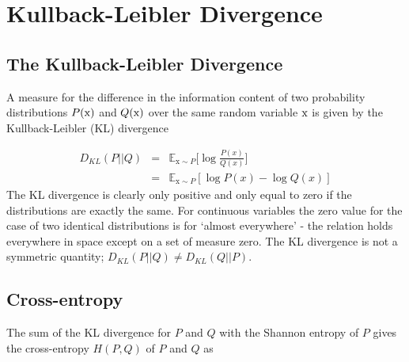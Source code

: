 \documentclass[twocolumn]{article}
\numberwithin{equation}{section}
\begin{document}

\section{Kullback-Leibler Divergence}\label{appendix:kl_div} 

\subsection{The Kullback-Leibler Divergence}\label{appendix:kl_div_section}

A measure for the difference in the information content of two probability distributions $P(\textup{x})$ and 
$Q(\textup{x})$ over the same random variable $\textup{x}$ is given by the Kullback-Leibler (KL) divergence 

\begin{eqnarray}
  D_{KL}(P||Q) &=& \mathbb{E}_{\text{x}\sim P} \bigg [\log \frac{P(x)}{Q(x)} \bigg ]\nonumber \\ 
               &=& \mathbb{E}_{\text{x}\sim P} [\log P(x) - \log Q(x)]  %
\end{eqnarray}
The KL divergence is clearly only positive and only equal to zero if the distributions are exactly the same. For 
continuous variables the zero value for the case of two identical distributions is for `almost everywhere' - the 
relation holds everywhere in space except on a set of measure zero. The KL divergence is not a symmetric quantity; 
$D_{KL}(P||Q) \neq  D_{KL}(Q||P)$.


\subsection{Cross-entropy}\label{appendix:cross_entropy}
The sum of the KL divergence for $P$ and $Q$ with the Shannon entropy of $P$ gives the cross-entropy $H(P,Q)$ of $P$ and 
$Q$ as
\end{document}
